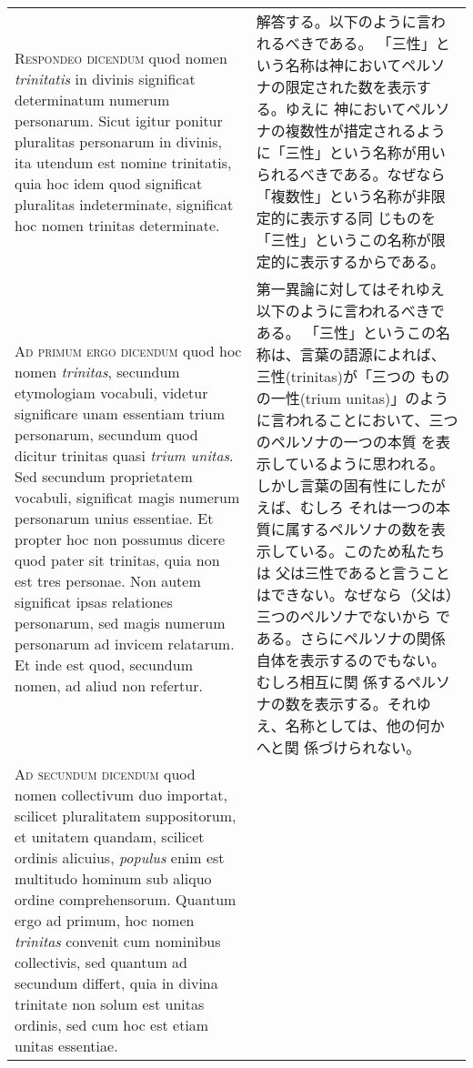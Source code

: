 \documentclass[10pt]{jsarticle} %
\begin{document}
\begin{longtable}{p{21em}p{21em}}
{\scshape Respondeo dicendum} quod nomen {\itshape trinitatis} in divinis significat
determinatum numerum personarum. Sicut igitur ponitur pluralitas
personarum in divinis, ita utendum est nomine trinitatis, quia hoc
idem quod significat pluralitas indeterminate, significat hoc nomen
trinitas determinate.


&

解答する。以下のように言われるべきである。
「三性」という名称は神においてペルソナの限定された数を表示する。ゆえに
 神においてペルソナの複数性が措定されるように「三性」という名称が用い
 られるべきである。なぜなら「複数性」という名称が非限定的に表示する同
 じものを「三性」というこの名称が限定的に表示するからである。

\\



{\scshape Ad primum ergo dicendum} quod hoc nomen {\itshape trinitas}, secundum etymologiam
vocabuli, videtur significare unam essentiam trium personarum,
secundum quod dicitur trinitas quasi {\itshape trium unitas}. Sed secundum
proprietatem vocabuli, significat magis numerum personarum unius
essentiae. Et propter hoc non possumus dicere quod pater sit trinitas,
quia non est tres personae. Non autem significat ipsas relationes
personarum, sed magis numerum personarum ad invicem relatarum. Et inde
est quod, secundum nomen, ad aliud non refertur.


&

第一異論に対してはそれゆえ以下のように言われるべきである。
「三性」というこの名称は、言葉の語源によれば、三性(trinitas)が「三つの
 ものの一性(trium unitas)」のように言われることにおいて、三つのペルソナの一つの本質
 を表示しているように思われる。しかし言葉の固有性にしたがえば、むしろ
 それは一つの本質に属するペルソナの数を表示している。このため私たちは
 父は三性であると言うことはできない。なぜなら（父は）三つのペルソナでないから
 である。さらにペルソナの関係自体を表示するのでもない。むしろ相互に関
 係するペルソナの数を表示する。それゆえ、名称としては、他の何かへと関
 係づけられない。


\\



{\scshape Ad secundum dicendum} quod nomen collectivum duo importat, scilicet
pluralitatem suppositorum, et unitatem quandam, scilicet ordinis
alicuius, {\itshape populus} enim est multitudo hominum sub aliquo ordine
comprehensorum. Quantum ergo ad primum, hoc nomen {\itshape trinitas} convenit
cum nominibus collectivis, sed quantum ad secundum differt, quia in
divina trinitate non solum est unitas ordinis, sed cum hoc est etiam
unitas essentiae.



\end{longtable}
\end{document}

